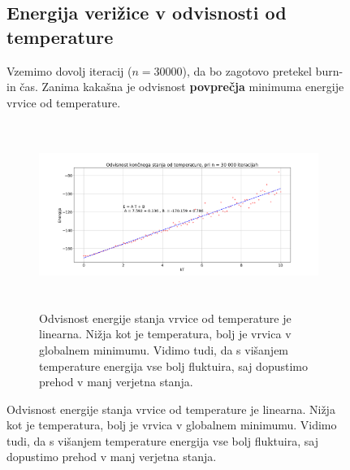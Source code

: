 \documentclass[11pt, a4paper]{article}
\begin{document}
\begin{figure}[H]
\subsection{Energija verižice v odvisnosti od temperature }
Vzemimo dovolj iteracij ($n= 30000$), da bo zagotovo pretekel burn-in čas. Zanima kakašna je odvisnost \textbf{povprečja} minimuma energije vrvice od temperature. 
\begin{figure}[H]
\centering
  \includegraphics[width=16cm, height=6cm]{prva_energija.png}
\caption{Odvisnost energije stanja vrvice od temperature je linearna. Nižja kot je temperatura, bolj je vrvica v globalnem minimumu. Vidimo tudi, da s višanjem temperature energija vse bolj fluktuira, saj dopustimo prehod v manj verjetna stanja.}
\end{figure} 

\end{figure}
\end{document}
